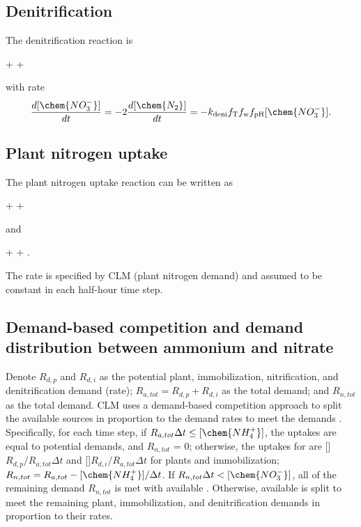 \documentclass[gmd, manuscript]{copernicus}
\begin{document}
\subsection{Denitrification} 
The denitrification reaction is
\begin{reaction}
 + \cdots {}  + \cdots
\label{rxn:deni}
\end{reaction}
with rate \citep{Dickinson2002} 
\begin{equation} 
\frac{d [\chem{NO_3^-}]}{d t} = -2\frac{d
[\chem{N_2}]}{d t} = -k_\text{deni} f_\text{T} f_\text{w}
f_\text{pH}[\chem{NO_3^-}].
\label{eq:deni}
\end{equation}

\subsection{Plant nitrogen uptake}
The plant nitrogen uptake reaction can be written as
\begin{reaction}
 + \cdots \rightarrow {} + \cdots
\label{rxn:plantatake}
\end{reaction}
and
\begin{reaction}
 + \cdots \rightarrow {} + \cdots.
\label{rxn:plantntake}
\end{reaction}
The rate is specified by CLM (plant nitrogen demand) and assumed to be
constant in each half-hour time step. 

\subsection{Demand-based competition and demand distribution between ammonium and nitrate}
\label{sec:demandbasedcompetition}
Denote $R_{d,p}$ and $R_{d,i}$ as the potential plant,
immobilization, nitrification, and denitrification demand (rate);
$R_{a,tot}=R_{d,p}+R_{d,i}$ as the total  demand; and
$R_{n,tot}$ as the total  demand. CLM uses a demand-based
competition approach to split the available sources in proportion to the demand
rates to meet the demands \citep{Oleson2013,Thornton2005}. Specifically, for
each time step, if $R_{a,tot}\Delta t \leq [\chem{NH_4^+}]$, the uptakes are
equal to potential demands, and $R_{n,tot}$ = 0; otherwise, the uptakes for
 are []$R_{d,p}/R_{a,tot}\Delta t$ and
[]$R_{d,i}/R_{a,tot}\Delta t$ for plants and immobilization;
$R_{n,tot}=R_{a,tot}-[\chem{NH_4^+}]/\Delta t$. If $R_{n,tot}\Delta t <
[\chem{NO_3^-}]$, all of the remaining
demand $R_{n,tot}$ is met with available . Otherwise, available
 is split to meet the remaining plant, immobilization, and
denitrification demands in proportion to their rates. 
\end{document}
